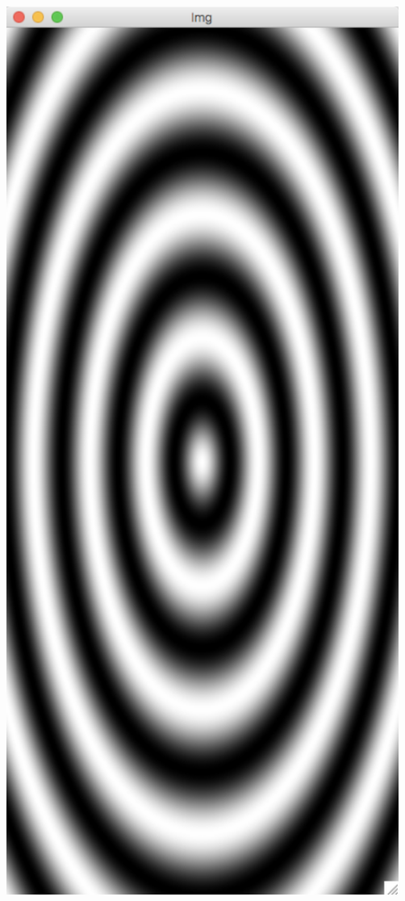\documentclass[rgb]{beamer}
\begin{document}
\begin{frame}[fragile]
\begin{footnotesize}
\begin{minipage}{.75\textwidth}
\begin{enumerate}
  \end{enumerate}
  \end{minipage}~~~\begin{minipage}{.2\textwidth}
  \includegraphics[width=1.2\textwidth]{../images/wav.png}
  \end{minipage}

\end{footnotesize}
\end{frame}
\end{document}
